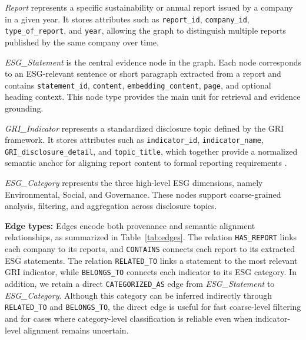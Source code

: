 \documentclass[sn-mathphys, oneside]{sn-jnl}
\begin{document}
\textit{Report} represents a specific sustainability or annual report issued by a
company in a given year. It stores attributes such as \texttt{report\_id},
\texttt{company\_id}, \texttt{type\_of\_report}, and \texttt{year}, allowing the graph
to distinguish multiple reports published by the same company over time.

\textit{ESG\_Statement} is the central evidence node in the graph. Each node corresponds
to an ESG-relevant sentence or short paragraph extracted from a report and contains
\texttt{statement\_id}, \texttt{content}, \texttt{embedding\_content}, \texttt{page},
and optional heading context. This node type provides the main unit for retrieval and
evidence grounding.

\textit{GRI\_Indicator} represents a standardized disclosure topic defined by the GRI
framework. It stores attributes such as \texttt{indicator\_id},
\texttt{indicator\_name}, \texttt{GRI\_disclosure\_detail}, and \texttt{topic\_title},
which together provide a normalized semantic anchor for aligning report content to
formal reporting requirements \cite{gri2021}.

\textit{ESG\_Category} represents the three high-level ESG dimensions, namely
Environmental, Social, and Governance. These nodes support coarse-grained analysis,
filtering, and aggregation across disclosure topics.

\textbf{Edge types:}
Edges encode both provenance and semantic alignment relationships, as summarized in
Table~\ref{tab:edges}. The relation \texttt{HAS\_REPORT} links each company to its
reports, and \texttt{CONTAINS} connects each report to its extracted ESG statements.
The relation \texttt{RELATED\_TO} links a statement to the most relevant GRI indicator,
while \texttt{BELONGS\_TO} connects each indicator to its ESG category. In addition,
we retain a direct \texttt{CATEGORIZED\_AS} edge from \textit{ESG\_Statement} to
\textit{ESG\_Category}. Although this category can be inferred indirectly through
\texttt{RELATED\_TO} and \texttt{BELONGS\_TO}, the direct edge is useful for fast
coarse-level filtering and for cases where category-level classification is reliable
even when indicator-level alignment remains uncertain.
\end{document}
